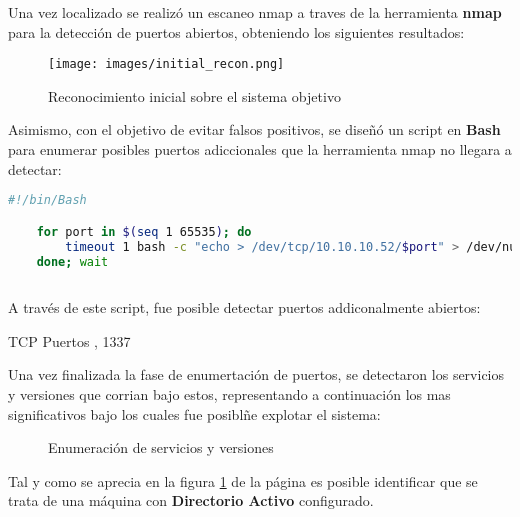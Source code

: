 \documentclass[a4paper]{article} %
\begin{document}
    \vspace{0.2cm}

    Una vez localizado se realizó un escaneo nmap a traves  
    de la herramienta \textbf{nmap} para la detección de 
    puertos abiertos, obteniendo los siguientes resultados:

    \begin{figure}[h]
    \begin{center}
    \texttt{[image: images/initial\_recon.png]}
    \end{center}
    \caption{Reconocimiento inicial sobre el sistema objetivo}    
    \end{figure}

    \clearpage
    Asimismo, con el objetivo de evitar falsos positivos, se diseñó 
    un script en \textbf{Bash} para enumerar  posibles puertos 
    adiccionales que la herramienta nmap no llegara a detectar:

    \vspace{0.2cm}

    \begin{lstlisting}[language=Bash, caption=Script personalizado para la enumeración de puertos]
    #!/bin/Bash

    for port in $(seq 1 65535); do
        timeout 1 bash -c "echo > /dev/tcp/10.10.10.52/$port" > /dev/null && echo "$port/tcp" &
    done; wait
        
    \end{lstlisting}
    
    \vspace{0.3cm}

    A través de este script, fue posible detectar puertos addiconalmente 
    abiertos:

    \begin{schema}{TCP}
    Puertos
    , 1337
    \end{schema}

    Una vez finalizada la fase de enumertación de puertos, se 
    detectaron los servicios y versiones que corrian bajo estos, 
    representando a continuación los mas significativos bajo los 
    cuales fue posiblñe explotar el sistema:

    \begin{figure}[h]
    \centering
    \caption{Enumeración de servicios y versiones}    
    \label{fig:servicesResults}
    \end{figure}

    \vspace{0.2cm}

    Tal y como se aprecia en la figura \ref{fig:servicesResults} de la 
    página \pageref{fig:servicesResults} es posible identificar  que se 
    trata de una máquina con \textbf{Directorio Activo} configurado.
\end{document}
